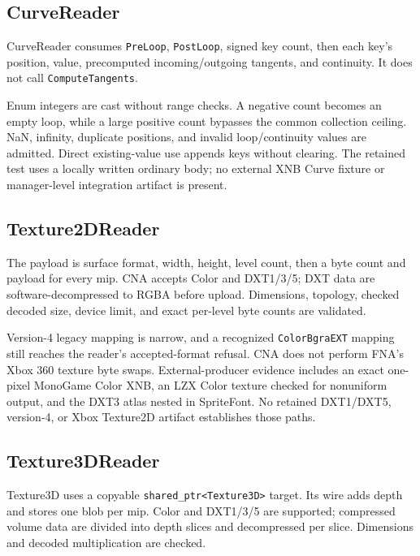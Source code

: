 \subsection{CurveReader}
\label{sec:xnb-curve-reader-contract}

CurveReader consumes \texttt{PreLoop}, \texttt{PostLoop}, signed key count, then each key's
position, value, precomputed incoming/outgoing tangents, and continuity. It does not call
\texttt{ComputeTangents}.

Enum integers are cast without range checks. A negative count becomes an empty loop, while a
large positive count bypasses the common collection ceiling. NaN, infinity, duplicate positions,
and invalid loop/continuity values are admitted. Direct existing-value use appends keys without
clearing. The retained test uses a locally written ordinary body; no external XNB Curve fixture
or manager-level integration artifact is present.

\subsection{Texture2DReader}
\label{sec:xnb-texture2d-reader-contract}

The payload is surface format, width, height, level count, then a byte count and payload for every
mip. CNA accepts Color and DXT1/3/5; DXT data are software-decompressed to RGBA before upload.
Dimensions, topology, checked decoded size, device limit, and exact per-level byte counts are
validated.

Version-4 legacy mapping is narrow, and a recognized \texttt{ColorBgraEXT} mapping still reaches
the reader's accepted-format refusal. CNA does not perform FNA's Xbox 360 texture byte swaps.
External-producer evidence includes an exact one-pixel MonoGame Color XNB, an LZX Color texture
checked for nonuniform output, and the DXT3 atlas nested in SpriteFont. No retained DXT1/DXT5,
version-4, or Xbox Texture2D artifact establishes those paths.

\subsection{Texture3DReader}
\label{sec:xnb-texture3d-reader-contract}

Texture3D uses a copyable \texttt{shared\_ptr<Texture3D>} target. Its wire adds depth and stores
one blob per mip. Color and DXT1/3/5 are supported; compressed volume data are divided into depth
slices and decompressed per slice. Dimensions and decoded multiplication are checked.

